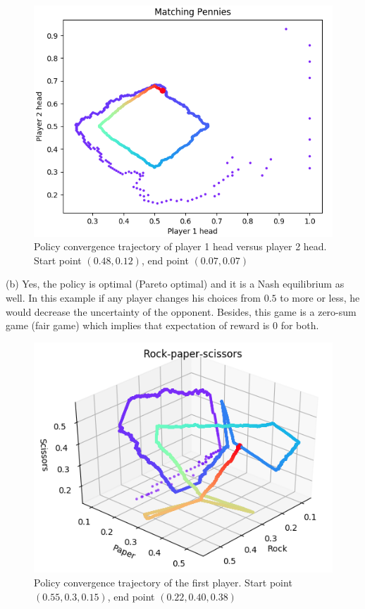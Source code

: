 \documentclass[journal]{IEEEtran}
\begin{document}
\begin{figure}[!t]

\centering
\includegraphics[scale=0.35]{figure/secondGameFirstPolicy4m.png}
\caption{Policy convergence trajectory of player 1 head versus player 2 head.
Start point $(0.48, 0.12)$, end point $(0.07, 0.07)$}
\label{Fig:secondPolFirstGame4}
\end{figure}

(b) Yes, the policy is optimal (Pareto optimal) and it is a Nash equilibrium as well. In this example if any player changes his choices from $0.5$ to more or less, he would decrease the uncertainty of the opponent. Besides, this game is a zero-sum game (fair game) which implies that expectation of reward is 0 for both.

\begin{figure}[!t]
\centering
\includegraphics[scale=0.37]{figure/thirdGameFirstPolicy1m.png}
\caption{Policy convergence trajectory of the first player. Start point $(0.55, 0.3, 0.15)$, end point $(0.22, 0.40, 0.38)$}
\label{Fig:thirdPolFirstGame5}
\end{figure}
\end{document}
